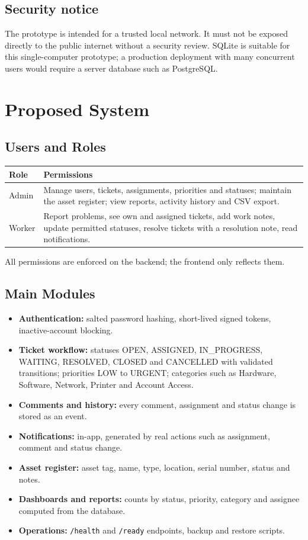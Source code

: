 \documentclass[12pt,a4paper]{article}
\begin{document}
\subsection{Security notice}
The prototype is intended for a trusted local network. It must not be exposed directly to the public internet without a security review. SQLite is suitable for this single-computer prototype; a production deployment with many concurrent users would require a server database such as PostgreSQL.

\section{Proposed System}
\subsection{Users and Roles}
\begin{center}
\begin{tabular}{@{}p{2.2cm}p{12cm}@{}}
\toprule
\textbf{Role} & \textbf{Permissions}\\
\midrule
Admin  & Manage users, tickets, assignments, priorities and statuses; maintain the asset register; view reports, activity history and CSV export.\\
Worker & Report problems, see own and assigned tickets, add work notes, update permitted statuses, resolve tickets with a resolution note, read notifications.\\
\bottomrule
\end{tabular}
\end{center}
All permissions are enforced on the backend; the frontend only reflects them.

\subsection{Main Modules}
\begin{itemize}[leftmargin=*]
  \item \textbf{Authentication:} salted password hashing, short-lived signed tokens, inactive-account blocking.
  \item \textbf{Ticket workflow:} statuses OPEN, ASSIGNED, IN\_PROGRESS, WAITING, RESOLVED, CLOSED and CANCELLED with validated transitions; priorities LOW to URGENT; categories such as Hardware, Software, Network, Printer and Account Access.
  \item \textbf{Comments and history:} every comment, assignment and status change is stored as an event.
  \item \textbf{Notifications:} in-app, generated by real actions such as assignment, comment and status change.
  \item \textbf{Asset register:} asset tag, name, type, location, serial number, status and notes.
  \item \textbf{Dashboards and reports:} counts by status, priority, category and assignee computed from the database.
  \item \textbf{Operations:} \texttt{/health} and \texttt{/ready} endpoints, backup and restore scripts.
\end{itemize}
\end{document}
